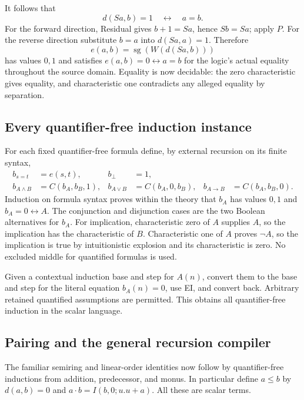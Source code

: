 It follows that
\[
                    d(Sa,b)=1\quad\longleftrightarrow\quad a=b.
\]
For the forward direction, Residual gives $b+1=Sa$, hence $Sb=Sa$;
apply $P$. For the reverse direction substitute $b=a$ into $d(Sa,a)=1$.
Therefore
\[
 e(a,b)=\operatorname{sg}(W(d(Sa,b)))
\]
has values $0,1$ and satisfies $e(a,b)=0\leftrightarrow a=b$ for the
logic's actual equality throughout the source domain. Equality is now
decidable: the zero characteristic gives equality, and characteristic
one contradicts any alleged equality by separation.

\subsection{Every quantifier-free induction instance}

For each fixed quantifier-free formula define, by external recursion on
its finite syntax,
\[
\begin{aligned}
 b_{s=t}&=e(s,t),& b_\bot&=1,\\
 b_{A\land B}&=C(b_A,b_B,1),&
 b_{A\lor B}&=C(b_A,0,b_B),&
 b_{A\to B}&=C(b_A,b_B,0).
\end{aligned}
\]
Induction on formula syntax proves within the theory that $b_A$ has
values $0,1$ and $b_A=0\leftrightarrow A$. The conjunction and
disjunction cases are the two Boolean alternatives for $b_A$. For
implication, characteristic zero of $A$ supplies $A$, so the implication
has the characteristic of $B$. Characteristic one of $A$ proves
$\neg A$, so the implication is true by intuitionistic explosion and
its characteristic is zero. No excluded middle for quantified formulas
is used.

Given a contextual induction base and step for $A(n)$, convert them to
the base and step for the literal equation $b_A(n)=0$, use EI, and
convert back. Arbitrary retained quantified assumptions are permitted.
This obtains all quantifier-free induction in the scalar language.

\subsection{Pairing and the general recursion compiler}

The familiar semiring and linear-order identities now follow by
quantifier-free inductions from addition, predecessor, and monus. In
particular define $a\le b$ by $d(a,b)=0$ and
$a\cdot b=I(b,0;u.u+a)$. All these are scalar terms.

